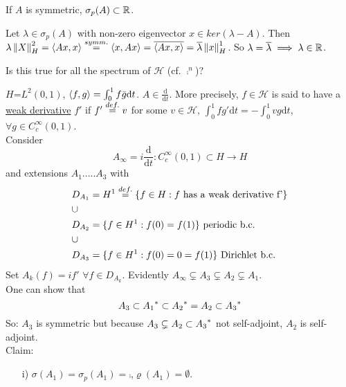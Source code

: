 \begin{lemma}\nl
	If $A$ is symmetric, $\sigma_p(A)\subset\mathbb{R}$.
	\begin{pf}{}{}
		Let $\lambda\in\sigma_p(A)$ with non-zero eigenvector $x\in ker(\lambda-A)$. Then $\lambda\left\|{X}\right\|_H^2=\left<{Ax},{x}\right>\stackrel{symm.}{=}\left<{x},{Ax}\right>=\overline{\left<{Ax},{x}\right>}=\overline{\lambda}\left\|{x}\right\|_H^1$. So $\lambda=\overline{\lambda}\implies \lambda\in\mathbb{R}$.
	\end{pf}
\end{lemma}
Is this true for all the spectrum of $\mathcal{H}$ (cf. $\comp^n$)?
\begin{example}\nl
	$H$=$L^2(0,1)$, $\left<{f},{g}\right>=\int_0^1f\bar{g} \mathrm{d}t$. $A\in\frac{\mathrm{d}}{\mathrm{d}t}$. More precisely, $f\in\mathcal{H}$ is said to have a \underline{weak derivative} $f'$ if $f'\stackrel{def.}{=}{v}$ for some $v\in \mathcal{H}$, $\int_0^1 fg'\mathrm{d}t=-\int_0^1 vg\mathrm{d}t$, $\forall g\in C^\infty_c(0,1)$.\\
	Consider
	$$
		A_\infty =i\frac{\mathrm{d}}{\mathrm{d}t}:C^\infty_c(0,1)\subset H\to H
	$$
	and extensions $A_1$.....$A_3$ with
	\begin{equation}
		\begin{aligned}
			 & D_{A_1}=H^1\stackrel{def.}{=}\{f\in H: f \text{ has a weak derivative  f'}\} \\
			 & \cup                                                             \\
			 & D_{A_2}=\{f\in H^1:f(0)=f(1)\}\text{ periodic b.c.}              \\
			 & \cup                                                             \\
			 & D_{A_3}=\{f\in H^1: f(0)=0=f(1)\}\text{ Dirichlet b.c.}          \\
		\end{aligned}
	\end{equation}
	Set $A_k(f)=if'\,\,\forall f\in D_{A_k}$. Evidently $ A_\infty\subsetneq A_3\subsetneq A_2 \subsetneq A_1$.\\
	One can show that
	$$
		A_3\subset{A_1}^*\subset{A_2}^*=A_2\subset{A_3}^*
	$$
	So: $A_3$ is symmetric but because $A_3\subsetneq A_2\subset {A_3}^*$ not self-adjoint, $A_2$ is self-adjoint.\\
	Claim:
	\begin{itemize}
		\item [i)] $\sigma(A_1)=\sigma_p(A_1)=\comp$,$ \varrho(A_1)=\emptyset$.

\end{itemize}
\end{example}
